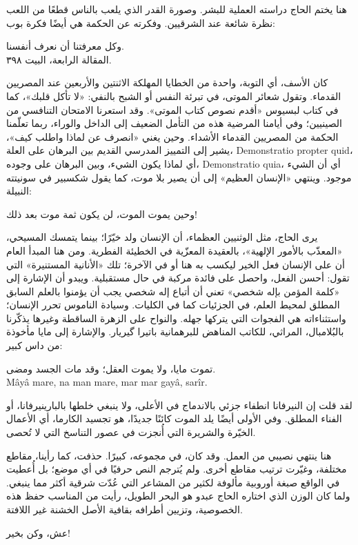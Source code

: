 
هنا يختم الحاج دراسته العملية للبشر. وصورة القدر الذي يلعب بالناس قطعًا من اللعب نظرة شائعة عند الشرقيين. وفكرته عن الحكمة هي أيضًا فكرة بوب:

\begin{SourceQuotation}
وكل معرفتنا أن نعرف أنفسنا.\\
المقالة الرابعة، البيت ٣٩٨.
\end{SourceQuotation}

كان الأسف، أي التوبة، واحدة من الخطايا المهلكة الاثنتين والأربعين عند المصريين القدماء. وتقول شعائر الموتى، في تبرئة النفس أو الشبح بالنفي: «لا تأكل قلبك»، كما في كتاب لبسيوس «أقدم نصوص كتاب الموتى». وقد استعرنا الامتحان التنافسي من الصينيين؛ وفي أيامنا المرضية هذه من التأمل الضعيف إلى الداخل والوراء، ربما تعلّمنا الحكمة من المصريين القدماء الأشداء. وحين يغني «انصرف عن لماذا واطلب كيف»، يشير إلى التمييز المدرسي القديم بين البرهان على العلة، \textenglish{Demonstratio propter quid}، أي لماذا يكون الشيء، وبين البرهان على وجوده، \textenglish{Demonstratio quia}، أي أن الشيء موجود. وينتهي «الإنسان العظيم» إلى أن يصير بلا موت، كما يقول شكسبير في سونيتته النبيلة:

\begin{SourceQuotation}
وحين يموت الموت، لن يكون ثمة موت بعد ذلك!
\end{SourceQuotation}

يرى الحاج، مثل الوثنيين العظماء، أن الإنسان ولد خيّرًا؛ بينما يتمسك المسيحي، «المعذّب بالأمور الإلهية»، بالعقيدة المعزّية في الخطيئة الفطرية. ومن هنا المبدأ العام أن على الإنسان فعل الخير ليكسب به هنا أو في الآخرة؛ تلك «الأنانية المستنيرة» التي تقول: أحسن الفعل، واحصل على فائدة مركبة في حال مستقبلية. ويبدو أن الإشارة إلى «كلمة المؤمن بإله شخصي» تعني أن أتباع إله شخصي يجب أن يؤمنوا بالعلم السابق المطلق لمحيط العلم، في الجزئيات كما في الكليات. وسيادة الناموس تحرر الإنسان؛ واستثناءاته هي الفجوات التي يتركها جهله. والنواح على الزهرة الساقطة وغيرها يذكّرنا بالبُلامبال، المراثي، للكاتب المناهض للبرهمانية باتيرا گيريار. والإشارة إلى مايا مأخوذة من داس كبير:

\begin{SourceQuotation}
تموت مايا، ولا يموت العقل؛ وقد مات الجسد ومضى.\\
\textenglish{Mâyâ mare, na man mare, mar mar gayâ, sarîr}.
\end{SourceQuotation}

لقد قلت إن النيرفانا انطفاء جزئي بالاندماج في الأعلى، ولا ينبغي خلطها بالبارينيرفانا، أو الفناء المطلق. وفي الأولى أيضًا يلد الموت كائنًا جديدًا، هو تجسيد الكارما، أي الأعمال الخيّرة والشريرة التي أُنجزت في عصور التناسخ التي لا تُحصى.

هنا ينتهي نصيبي من العمل. وقد كان، في مجموعه، كبيرًا. حذفت، كما رأينا، مقاطع مختلفة، وغيّرت ترتيب مقاطع أخرى. ولم يُترجم النص حرفيًا في أي موضع؛ بل أُعطيت في الواقع صبغة أوروبية مألوفة لكثير من المشاعر التي عُدّت شرقية أكثر مما ينبغي. ولما كان الوزن الذي اختاره الحاج عبدو هو البحر الطويل، رأيت من المناسب حفظ هذه الخصوصية، وتزيين أطرافه بقافية الأصل الخشنة غير اللافتة.

عش، وكن بخير!
